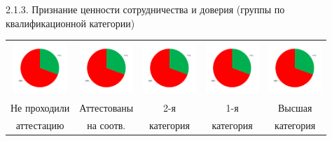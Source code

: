 \begin{frame}{2.1.3. Признание ценности сотрудничества и доверия (группы по квалификационной категории) }
\begin{tabular}{ccccc}
\includegraphics[width=2cm, height=2cm]{diag.png} & 
\includegraphics[width=2cm, height=2cm]{diag.png} & 
\includegraphics[width=2cm, height=2cm]{diag.png} & 
\includegraphics[width=2cm, height=2cm]{diag.png} & 
\includegraphics[width=2cm, height=2cm]{diag.png} \\
 Не проходили &  Аттестованы & 2-я &  1-я  & Высшая \\ 
  аттестацию   &  на соотв. & категория &  категория  & категория \\ 
\end{tabular}

\end{frame}


